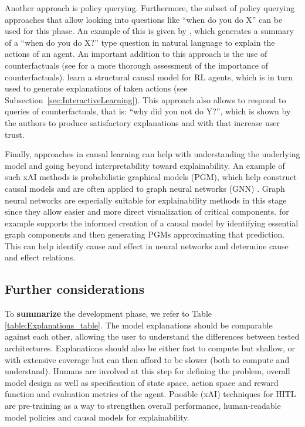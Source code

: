\documentclass[twoside,11pt]{article}
\begin{document}
Another approach is policy querying.
Furthermore, the subset of policy querying approaches that allow looking into questions like ``when do you do X'' can be used for this phase.
An example of this is given by \citet{HayesShah:2017:AutonomousPolicyExplanation}, which generates a summary of a ``when do you do X?'' type question in natural language to explain the actions of an agent. An important addition to this approach is the use of counterfactuals (see \citet{EvansEtAl:2021:ExplainabilityParadox} for a more thorough assessment of the importance of counterfactuals). \citet{MadumalEtAl:2020:CausalRLCFs} learn a structural causal model for RL agents, which is in turn used to generate explanations of taken actions (see Subsection~\ref{sec:InteractiveLearning}). This approach also allows to respond to queries of counterfactuals, that is: ``why did you not do Y?'', which is shown by the authors to produce satisfactory explanations and with that increase user trust.

Finally, approaches in causal learning can help with understanding the underlying model and going beyond interpretability toward explainability.
An example of such xAI methods is probabilistic graphical models (PGM), which help construct causal models and are often applied to graph neural networks (GNN) \citep{Saranti:2019:LearningCompetencePGMs}. Graph neural networks are especially suitable for explainability methods in this stage since they allow easier and more direct visualization of critical components. \citet{Vu:2020:PGMExplainer} for example supports the informed creation of a causal model by identifying essential graph components and then generating PGMs approximating that prediction. This can help identify cause and effect in neural networks and determine cause and effect relations.

\subsection{Further considerations}





\noindent To \textbf{summarize} the development phase, we refer to Table \ref{table:Explanations_table}. The model explanations should be comparable against each other, allowing the user to understand the differences between tested architectures. Explanations should also be either fast to compute but shallow, or with extensive coverage but can then afford to be slower (both to compute and understand). Humans are involved at this step for defining the problem, overall model design as well as specification of state space, action space and reward function and evaluation metrics of the agent. Possible (xAI) techniques for HITL are pre-training as a way to strengthen overall performance, human-readable model policies and causal models for explainability. 
\end{document}
